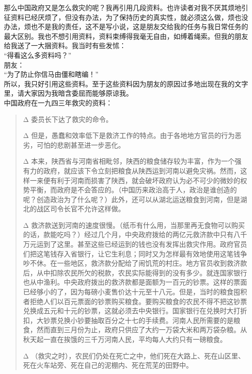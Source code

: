 那么中国政府又是怎么救灾的呢？我再引用几段资料。也许读者对我不厌其烦地引征资料已经厌烦了，但没有办法，为了保持历史的真实性，就必须这么做，烦也没办法，烦也不是我的责任，这不是写小说，这是朋友交给我的任务与我日常任务的最大区别。我也不想引用资料，资料束缚得我毫无自由，如缚着绳索。但我的朋友给我送了一大捆资料。我当时有些发怵：\\

“得看这么多资料吗？”\\

朋友：\\

“为了防止你信马由僵和瞎编！”\\

所以，我只好引用这些资料。至于这些资料因为朋友的原因过多地出现在我的文字里，请大家因为我暗含委屈而能够原谅我。\\

中国政府在一九四三年救灾的资料：\\

\begin{quote}
	\begin{description}
		\item {\Add Δ} 委员长下达了救灾的命令。\\
		
		\item {\Add Δ} 但是，愚蠢和效率低下是救济工作的特点。由于各地地方官员的行为恶劣，可怕的悲剧甚至进一步恶化。\\
		
		\item {\Add Δ} 本来，陕西省与河南省相毗邻，陕西的粮食储存较为丰富，作为一个强有力的政府，就应该下令立刻把粮食从陕西运到河南以避免灾祸。然而，这样一来便有利于河南而损害了陕西，就会破坏政府认为必不可少的微妙的权势平衡，而政府是不会答应的。（中国历来政治高于人，政治是谁创造的呢？创造政治为了什么呢？）此外，还可以从湖北运送粮食到河南，但是湖北的战区司令长官不允许这样做。\\
		
		\item {\Add Δ} 救济款送到河南的速度很慢。（纸币有什么用，当那里再无食物可以购买的话，款能吃吗？）经过几个月，中央政府拨给的两亿元救济款中只有八千万元运到了这里。甚至这些已经运到的钱也没有发挥出救灾作用。政府官员们把这笔钱存入省银行，让它生利息；同时又为怎样最有效地使用这笔钱争吵不休。在一些地区，救济款分配给了闹饥荒的村庄。地方官员收到救济款后，从中扣除农民所欠的税款，农民实际能得到的没有多少。就连国家银行也从中渔利。中央政府拨出的救济款都是面额为一百元的钞票。这样的票面已经够小的了，因为每磅小麦售价达十元至十八元。但是，当时的粮食囤积者拒绝人们以百元票面的钞票购买粮食。要购买粮食的农民不得不把这钞票兑换成五元和十元的钞票，这就必须去中央银行。国家银行在兑换时大打折扣，大钞票兑换小钞要抽取百分之十七的手续费。河南人民所需要的是粮食，然而直到三月份为止，政府只供应了大约一万袋大米和两万袋杂粮。从秋天起一直在挨饿的三千万河南人民，平均每人大约只有一磅粮食。\\
		
		\item {\Add Δ} （救灾之时），农民们仍处在死亡之中，他们死在大路上、死在山区里、死在火车站旁、死在自己的泥棚内、死在荒芜的田野中。\\
	\end{description}
\end{quote}

